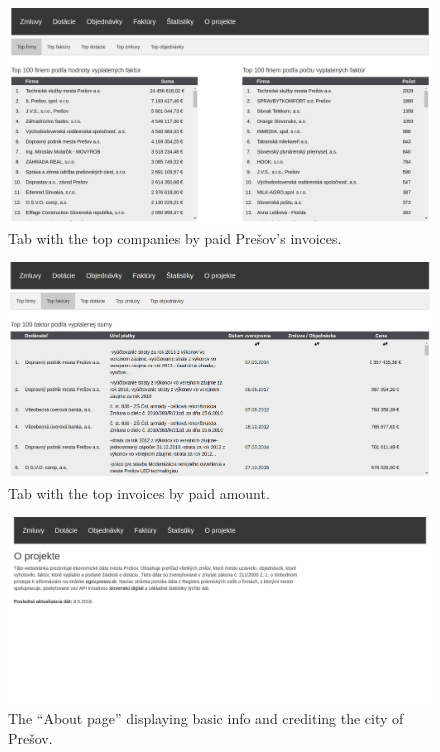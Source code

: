 \documentclass[thesis=B,english]{sprlajur-slovakopendata}[2018/05/12]
\begin{document}
{	\begin{figure}[H]
		\begin{center}
			\includegraphics[scale=0.30]{pictures/statistics.png}
			\caption{Tab with the top companies by paid Prešov's invoices.}
			\label{fig:webapp-topcompanies}
		\end{center}
	\end{figure}
	
	\begin{figure}[H]
		\begin{center}
			\includegraphics[scale=0.30]{pictures/topInvoices.png}
			\caption{Tab with the top invoices by paid amount.}
			\label{fig:webapp-topinvoices}
		\end{center}
	\end{figure}
	
	\begin{figure}[H]
		\begin{center}
			\includegraphics[scale=0.30]{pictures/about.png}
			\caption{The ``About page'' displaying basic info and crediting the city of Prešov.}
			\label{fig:webapp-about}
		\end{center}
	\end{figure}
	
}
\end{document}
